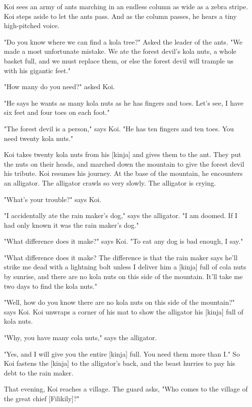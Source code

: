 Koi sees an army of ants marching in an endless column as wide as a zebra stripe. Koi steps aside to let the ants pass. And as the column passes, he hears a tiny high-pitched voice.

"Do you know where we can find a kola tree?" Asked the leader of the ants. "We made a most unfortunate mistake. We ate the forest devil's kola nuts, a whole basket full, and we must replace them, or else the forest devil will trample us with his gigantic feet."

"How many do you need?" asked Koi.

"He says he wants as many kola nuts as he has fingers and toes. Let's see, I have six feet and four toes on each foot."

"The forest devil is a person," says Koi. "He has ten fingers and ten toes. You need twenty kola nuts."

Koi takes twenty kola nuts from his [kinja] and gives them to the ant. They put the nuts on their heads, and marched down the mountain to give the forest devil his tribute. Koi resumes his journey. At the base of the mountain, he encounters an alligator. The alligator crawls so very slowly. The alligator is crying.

"What's your trouble?" says Koi.

"I accidentally ate the rain maker's dog," says the alligator. "I am doomed. If I had only known it was the rain maker's dog."

"What difference does it make?" says Koi. "To eat any dog is bad enough, I say."

"What difference does it make? The difference is that the rain maker says he'll strike me dead with a lightning bolt unless I deliver him a [kinja] full of cola nuts by sunrise, and there are no kola nuts on this side of the mountain. It'll take me two days to find the kola nuts."

"Well, how do you know there are no kola nuts on this side of the mountain?" says Koi. Koi unwraps a corner of his mat to show the alligator his [kinja] full of kola nuts.

"Why, you have many cola nuts," says the alligator.

"Yes, and I will give you the entire [kinja] full. You need them more than I." So Koi fastens the [kinja] to the alligator's back, and the beast hurries to pay his debt to the rain maker.

That evening, Koi reaches a village. The guard asks, "Who comes to the village of the great chief [Filikily]?"

